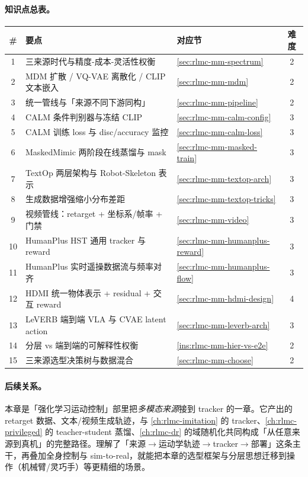 \paragraph{知识点总表。}
\begin{center}
\small
\begin{tabular}{@{}cllc@{}}
\toprule
\# & 要点 & 对应节 & 难度 \\
\midrule
1 & 三来源时代与精度-成本-灵活性权衡 & \cref{sec:rlmc-mm-spectrum} & 2 \\
2 & MDM 扩散 / VQ-VAE 离散化 / CLIP 文本嵌入 & \cref{sec:rlmc-mm-mdm} & 2 \\
3 & 统一管线与「来源不同下游同构」 & \cref{sec:rlmc-mm-pipeline} & 2 \\
4 & CALM 条件判别器与冻结 CLIP & \cref{sec:rlmc-mm-calm-config} & 3 \\
5 & CALM 训练 loss 与 disc/accuracy 监控 & \cref{sec:rlmc-mm-calm-loss} & 3 \\
6 & MaskedMimic 两阶段在线蒸馏与 mask & \cref{sec:rlmc-mm-masked-train} & 3 \\
7 & TextOp 两层架构与 Robot-Skeleton 表示 & \cref{sec:rlmc-mm-textop-arch} & 3 \\
8 & 生成数据增强缩小分布差距 & \cref{sec:rlmc-mm-textop-tricks} & 3 \\
9 & 视频管线：retarget + 坐标系/帧率 + 门禁 & \cref{sec:rlmc-mm-video} & 3 \\
10 & HumanPlus HST 通用 tracker 与 reward & \cref{sec:rlmc-mm-humanplus-reward} & 3 \\
11 & HumanPlus 实时遥操数据流与频率对齐 & \cref{sec:rlmc-mm-humanplus-flow} & 3 \\
12 & HDMI 统一物体表示 + residual + 交互 reward & \cref{sec:rlmc-mm-hdmi-design} & 4 \\
13 & LeVERB 端到端 VLA 与 CVAE latent action & \cref{sec:rlmc-mm-leverb-arch} & 3 \\
14 & 分层 vs 端到端的可解释性权衡 & \cref{ins:rlmc-mm-hier-vs-e2e} & 2 \\
15 & 三来源选型决策树与数据混合 & \cref{sec:rlmc-mm-choose} & 2 \\
\bottomrule
\end{tabular}
\end{center}

\paragraph{后续关系。}本章是「强化学习运动控制」部里把\emph{多模态来源}接到 tracker 的一章。它产出的 retarget 数据、文本/视频生成轨迹，与 \cref{ch:rlmc-imitation} 的 tracker、\cref{ch:rlmc-privileged} 的 teacher-student 蒸馏、\cref{ch:rlmc-dr} 的域随机化共同构成「从任意来源到真机」的完整路径。理解了「来源$\to$运动学轨迹$\to$tracker$\to$部署」这条主干，再叠加全身控制与 sim-to-real，就能把本章的选型框架与分层思想迁移到操作（机械臂/灵巧手）等更精细的场景。

